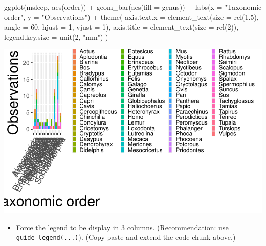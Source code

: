 \documentclass[
  letterpaper,
  DIV=11,
  numbers=noendperiod]{scrartcl}
\newenvironment{Shaded}{\begin{snugshade}}{\end{snugshade}}
\newcommand{\AttributeTok}[1]{\textcolor[rgb]{0.40,0.45,0.13}{#1}}
\newcommand{\DecValTok}[1]{\textcolor[rgb]{0.68,0.00,0.00}{#1}}
\newcommand{\FloatTok}[1]{\textcolor[rgb]{0.68,0.00,0.00}{#1}}
\newcommand{\FunctionTok}[1]{\textcolor[rgb]{0.28,0.35,0.67}{#1}}
\newcommand{\NormalTok}[1]{\textcolor[rgb]{0.00,0.23,0.31}{#1}}
\newcommand{\SpecialCharTok}[1]{\textcolor[rgb]{0.37,0.37,0.37}{#1}}
\newcommand{\StringTok}[1]{\textcolor[rgb]{0.13,0.47,0.30}{#1}}
\providecommand{\tightlist}{%
  \setlength{\itemsep}{0pt}\setlength{\parskip}{0pt}}\usepackage{longtable,booktabs,array}
\begin{document}
\begin{Shaded}
\begin{Highlighting}[]
\FunctionTok{ggplot}\NormalTok{(msleep, }\FunctionTok{aes}\NormalTok{(order)) }\SpecialCharTok{+}
  \FunctionTok{geom\_bar}\NormalTok{(}\FunctionTok{aes}\NormalTok{(}\AttributeTok{fill =}\NormalTok{ genus)) }\SpecialCharTok{+}
  \FunctionTok{labs}\NormalTok{(}\AttributeTok{x =} \StringTok{"Taxonomic order"}\NormalTok{, }\AttributeTok{y =} \StringTok{"Observations"}\NormalTok{) }\SpecialCharTok{+}
  \FunctionTok{theme}\NormalTok{(}
    \AttributeTok{axis.text.x =} \FunctionTok{element\_text}\NormalTok{(}\AttributeTok{size =} \FunctionTok{rel}\NormalTok{(}\FloatTok{1.5}\NormalTok{), }\AttributeTok{angle =} \DecValTok{60}\NormalTok{, }\AttributeTok{hjust =} \DecValTok{1}\NormalTok{, }\AttributeTok{vjust =} \DecValTok{1}\NormalTok{),}
    \AttributeTok{axis.title =} \FunctionTok{element\_text}\NormalTok{(}\AttributeTok{size =} \FunctionTok{rel}\NormalTok{(}\DecValTok{2}\NormalTok{)),}
    \AttributeTok{legend.key.size =} \FunctionTok{unit}\NormalTok{(}\DecValTok{2}\NormalTok{, }\StringTok{"mm"}\NormalTok{)}
\NormalTok{    )}
\end{Highlighting}
\end{Shaded}

\includegraphics{5-ggplot2_kevin_files/figure-pdf/unnamed-chunk-21-1.pdf}

\begin{itemize}
\tightlist
\item
  Force the legend to be display in 3 columns. (Recommendation: use
  \texttt{guide\_legend(...)}). (Copy-paste and extend the code chunk
  above.)
\end{itemize}
\end{document}
